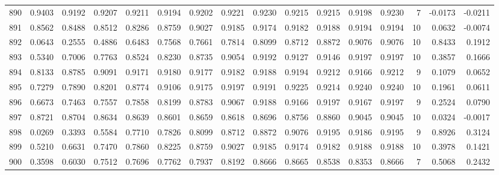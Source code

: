 \begin{tabular}{lrrrrrrrrrrrrrrr}
890 &      0.9403 &  0.9192 &  0.9207 &  0.9211 &  0.9194 &  0.9202 &  0.9221 &  0.9230 &  0.9215 &  0.9215 &   0.9198 &     0.9230 &      7 &                   -0.0173 &                    -0.0211 \\
891 &      0.8562 &  0.8488 &  0.8512 &  0.8286 &  0.8759 &  0.9027 &  0.9185 &  0.9174 &  0.9182 &  0.9188 &   0.9194 &     0.9194 &     10 &                    0.0632 &                    -0.0074 \\
892 &      0.0643 &  0.2555 &  0.4886 &  0.6483 &  0.7568 &  0.7661 &  0.7814 &  0.8099 &  0.8712 &  0.8872 &   0.9076 &     0.9076 &     10 &                    0.8433 &                     0.1912 \\
893 &      0.5340 &  0.7006 &  0.7763 &  0.8524 &  0.8230 &  0.8735 &  0.9054 &  0.9192 &  0.9127 &  0.9146 &   0.9197 &     0.9197 &     10 &                    0.3857 &                     0.1666 \\
894 &      0.8133 &  0.8785 &  0.9091 &  0.9171 &  0.9180 &  0.9177 &  0.9182 &  0.9188 &  0.9194 &  0.9212 &   0.9166 &     0.9212 &      9 &                    0.1079 &                     0.0652 \\
895 &      0.7279 &  0.7890 &  0.8201 &  0.8774 &  0.9106 &  0.9175 &  0.9197 &  0.9191 &  0.9225 &  0.9214 &   0.9240 &     0.9240 &     10 &                    0.1961 &                     0.0611 \\
896 &      0.6673 &  0.7463 &  0.7557 &  0.7858 &  0.8199 &  0.8783 &  0.9067 &  0.9188 &  0.9166 &  0.9197 &   0.9167 &     0.9197 &      9 &                    0.2524 &                     0.0790 \\
897 &      0.8721 &  0.8704 &  0.8634 &  0.8639 &  0.8601 &  0.8659 &  0.8618 &  0.8696 &  0.8756 &  0.8860 &   0.9045 &     0.9045 &     10 &                    0.0324 &                    -0.0017 \\
898 &      0.0269 &  0.3393 &  0.5584 &  0.7710 &  0.7826 &  0.8099 &  0.8712 &  0.8872 &  0.9076 &  0.9195 &   0.9186 &     0.9195 &      9 &                    0.8926 &                     0.3124 \\
899 &      0.5210 &  0.6631 &  0.7470 &  0.7860 &  0.8225 &  0.8759 &  0.9027 &  0.9185 &  0.9174 &  0.9182 &   0.9188 &     0.9188 &     10 &                    0.3978 &                     0.1421 \\
900 &      0.3598 &  0.6030 &  0.7512 &  0.7696 &  0.7762 &  0.7937 &  0.8192 &  0.8666 &  0.8665 &  0.8538 &   0.8353 &     0.8666 &      7 &                    0.5068 &                     0.2432 \\

\end{tabular}
